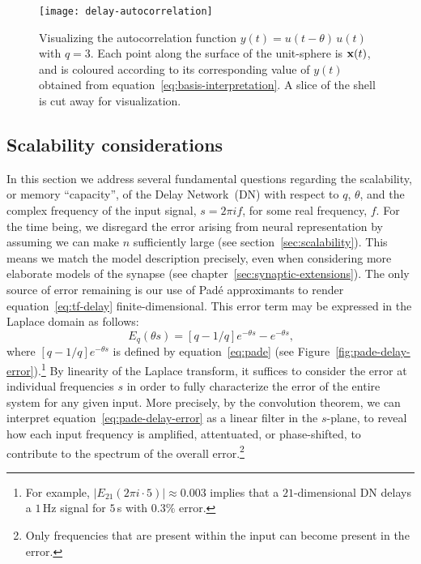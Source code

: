 \begin{figure}
\centering
  \texttt{[image: delay-autocorrelation]}
  \caption{ \label{fig:delay-autocorrelation} 
    Visualizing the autocorrelation function $y(t) = u(t - \theta)\, u(t)$ with $q=3$.
    Each point along the surface of the unit-sphere is $\mathbf{x}(t)$, and is coloured according to its corresponding value of $y(t)$ obtained from equation~\ref{eq:basis-interpretation}.
    A slice of the shell is cut away for visualization.
  } 
\end{figure}

\subsection{Scalability considerations}
\label{sec:delay-scalability}


In this section we address several fundamental questions regarding the scalability, or memory ``capacity'', of the Delay Network~(DN) with respect to $q$, $\theta$, and the complex frequency of the input signal, $s = 2 \pi i f$, for some real frequency, $f$.
For the time being, we disregard the error arising from neural representation by assuming we can make $n$ sufficiently large (see section~\ref{sec:scalability}).
This means we match the model description precisely, even when considering more elaborate models of the synapse (see chapter~\ref{sec:synaptic-extensions}).
The only source of error remaining is our use of Pad\'e approximants to render equation~\ref{eq:tf-delay} finite-dimensional.
This error term may be expressed in the Laplace domain as follows:
\begin{equation} \label{eq:pade-delay-error}
E_q(\theta s) = [q-1/q]e^{-\theta s} - e^{-\theta s} \text{,}
\end{equation}
where $[q-1/q]e^{-\theta s}$ is defined by equation~\ref{eq:pade} (see Figure~\ref{fig:pade-delay-error}).\footnote{%
For example, $|E_{21}(2 \pi i \cdot 5)| \approx 0.003$ implies that a $21$-dimensional DN delays a $1$\,Hz signal for $5$\,s with $0.3\%$ error.}
By linearity of the Laplace transform, it suffices to consider the error at individual frequencies $s$ in order to fully characterize the error of the entire system for any given input.
More precisely, by the convolution theorem, we can interpret equation~\ref{eq:pade-delay-error} as a linear filter in the $s$-plane, to reveal how each input frequency is amplified, attentuated, or phase-shifted, to contribute to the spectrum of the overall error.\footnote{%
Only frequencies that are present within the input can become present in the error.}

